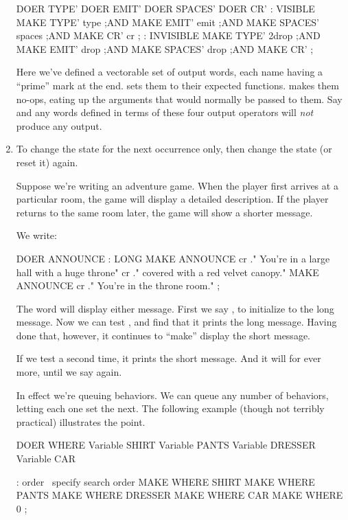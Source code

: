 \begin{enumerate}
\begin{Code}
DOER TYPE'
DOER EMIT'
DOER SPACES'
DOER CR'
: VISIBLE     MAKE TYPE'  type ;AND
              MAKE EMIT'  emit ;AND
              MAKE SPACES'  spaces ;AND
              MAKE CR'  cr ;
: INVISIBLE   MAKE TYPE'  2drop ;AND
              MAKE EMIT'  drop ;AND
              MAKE SPACES'  drop ;AND
              MAKE CR'  ;
\end{Code}
Here we've defined a vectorable set of output words, each name having
a ``prime'' mark at the end.  sets them to their
expected functions.   makes them no-ops, eating up
the arguments that would normally be passed to them. Say
 and any words defined in terms of these four output
operators will \emph{not} produce any output.

\item To change the state for the next occurrence only, then change
the state (or reset it) again.

Suppose we're writing an adventure game. When the player first arrives
at a particular room, the game will display a detailed description. If
the player returns to the same room later, the game will show a
shorter message.

\goodbreak
We write:
\begin{Code}
DOER ANNOUNCE
: LONG MAKE ANNOUNCE
   cr ." You're in a large hall with a huge throne"
   cr ." covered with a red velvet canopy."
         MAKE ANNOUNCE
   cr ." You're in the throne room." ;
\end{Code}
The word  will display either message. First we say
, to initialize  to the long message. Now we
can test , and find that it prints the long message.
Having done that, however, it continues to ``make'' 
display the short message.

If we test  a second time, it prints the short message.
And it will for ever more, until we say  again.

In effect we're queuing behaviors. We can queue any number of behaviors,
letting each one set the next. The following example (though not terribly
practical) illustrates the point.

\begin{Code}
DOER WHERE
Variable SHIRT
Variable PANTS
Variable DRESSER
Variable CAR

: order  \  specify search order
   MAKE WHERE  SHIRT   MAKE WHERE  PANTS
   MAKE WHERE  DRESSER   MAKE WHERE CAR
   MAKE WHERE  0 ;


\end{Code}
\end{enumerate}
